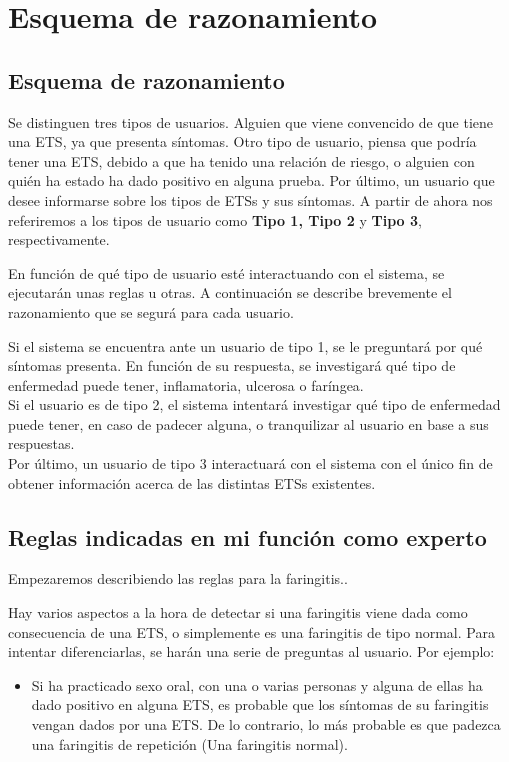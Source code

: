 
\chapter{Esquema de razonamiento}

\section{Esquema de razonamiento}

Se distinguen tres tipos de usuarios. Alguien que viene convencido de que tiene una ETS, ya que presenta síntomas. Otro tipo de usuario, piensa que podría tener una ETS, debido a que ha tenido una relación de riesgo, o alguien con quién ha estado ha dado positivo en alguna prueba. Por último, un usuario que desee informarse sobre los tipos de ETSs y sus síntomas. A partir de ahora nos referiremos a los tipos de usuario como \textbf{Tipo 1, Tipo 2} y \textbf{Tipo 3}, respectivamente.

En función de qué tipo de usuario esté interactuando con el sistema, se ejecutarán unas reglas u otras. A continuación se describe brevemente el razonamiento que se segurá para cada usuario.

Si el sistema se encuentra ante un usuario de tipo 1, se le preguntará por qué síntomas presenta. En función de su respuesta, se investigará qué tipo de enfermedad puede tener, inflamatoria, ulcerosa o faríngea. \\
Si el usuario es de tipo 2, el sistema intentará investigar qué tipo de enfermedad puede tener, en caso de padecer alguna, o tranquilizar al usuario en base a sus respuestas.\\
Por último, un usuario de tipo 3 interactuará con el sistema con el único fin de obtener información acerca de las distintas ETSs existentes.

\section{Reglas indicadas en mi función como experto}

Empezaremos describiendo las reglas para la faringitis..

Hay varios aspectos a la hora de detectar si una faringitis viene dada como consecuencia de una ETS, o simplemente es una faringitis de tipo normal. Para intentar diferenciarlas, se harán una serie de preguntas al usuario. Por ejemplo:
\begin{itemize}
  \item Si ha practicado sexo oral, con una o varias personas y alguna de ellas ha dado positivo en alguna ETS, es probable que los síntomas de su faringitis vengan dados por una ETS. De lo contrario, lo más probable es que padezca una faringitis de repetición (Una faringitis normal).
\end{itemize}

